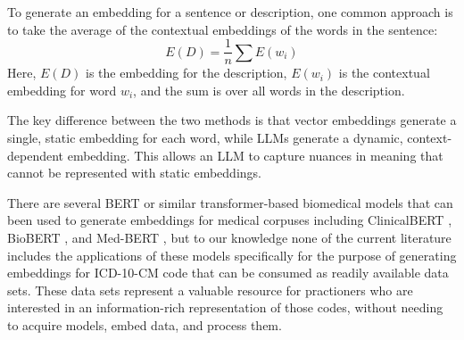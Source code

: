 \documentclass{bmcart}
\begin{document}
To generate an embedding for a sentence or description, one common approach is to take the average of the contextual embeddings of the words in the sentence:
\begin{equation*}
E(D) = \frac{1}{n } \sum E(w_i)
\end{equation*}
Here, $E(D)$ is the embedding for the description, $E(w_i)$ is the contextual 
embedding for word $w_i$, and the sum is over all words in the description.

The key difference between the two methods is that vector embeddings generate 
a single, static embedding for each word, while LLMs generate a dynamic, 
context-dependent embedding. This allows an LLM to capture nuances in meaning 
that cannot be represented with static embeddings.

There are several  
BERT or similar transformer-based biomedical models that can been used 
to generate embeddings for medical corpuses including ClinicalBERT 
\cite{huang2019,alsentzer2019}, BioBERT \cite{lee2020}, and
Med-BERT \cite{rasmy2021}, but to our knowledge none of the current 
literature includes the 
applications of these models specifically for the purpose of generating 
embeddings for ICD-10-CM code that can be consumed as readily available 
data sets. These data sets represent a valuable resource for practioners
who are interested in an information-rich representation of those codes,
without needing to acquire models, embed data, and process them.

\end{document}
